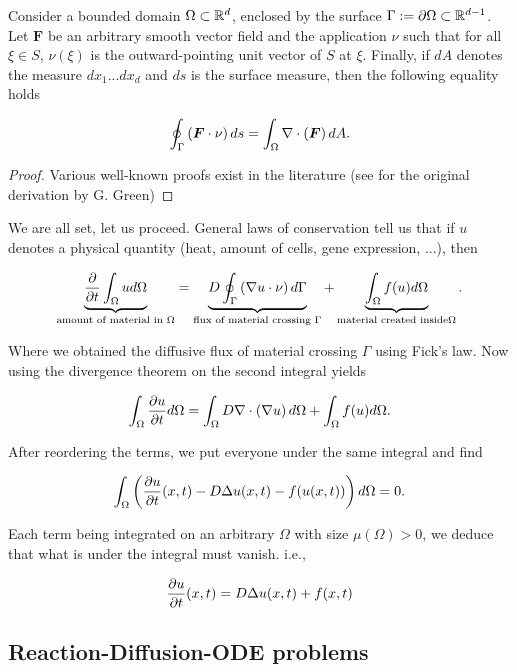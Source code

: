 \begin{theorem}
	Consider a bounded domain $\Omega \subset \mathbb{R}^d$, enclosed by the surface $\Gamma := \partial \Omega \subset \mathbb{R}^{d-1}$. Let $\bm F$ be an arbitrary smooth vector field and the application $\nu$ such that for all $\xi \in S$, $\nu(\xi)$ is the outward-pointing unit vector of $S$ at $\xi$. Finally, if $dA$ denotes the measure $d x_1 ... d x_d$ and $ds$ is the surface measure, then the following equality holds
	
	$$\oint_\Gamma \left( \bm F \cdot \nu \right) ds = \int_\Omega \nabla \cdot \left( \bm F\right) d A.$$
\end{theorem}

\begin{proof}
	Various well-known proofs exist in the literature (see \cite{https://doi.org/10.48550/arxiv.0807.0088} for the original derivation by G. Green)
\end{proof}

We are all set, let us proceed. General laws of conservation tell us that if $u$ denotes a physical quantity (heat, amount of cells, gene expression, ...), then

$$\underbrace{\frac{\partial}{\partial t} \int_{\Omega} u d\Omega}_{\text{amount of material in } \Omega} =  \underbrace{D \oint_\Gamma \left( \nabla u \cdot \nu \right) d\Gamma}_{\text{flux of material crossing } \Gamma} + \underbrace{\int_\Omega f(u) d\Omega}_{\text{material created inside} \Omega}.$$

Where we obtained the diffusive flux of material crossing $\Gamma$ using Fick's law. Now using the divergence theorem on the second integral yields

$$\int_{\Omega} \frac{\partial u}{\partial t} d\Omega =  \int_\Omega D \nabla \cdot \left( \nabla u \right) d\Omega + \int_\Omega f(u) d\Omega.$$

After reordering the terms, we put everyone under the same integral and find

$$\int_\Omega \left( \frac{\partial u}{\partial t}(x, t) - D \Delta u (x, t) - f(u(x, t)) \right) d\Omega = 0.$$

Each term being integrated on an arbitrary $\Omega$ with size $\mu(\Omega) > 0$, we deduce that what is under the integral must vanish. i.e., 

\begin{equation}\label{eq:rdeq} \frac{\partial u }{\partial t}(x, t) = D \Delta u(x, t) + f(x, t)\end{equation}

\subsection{Reaction-Diffusion-ODE problems}


